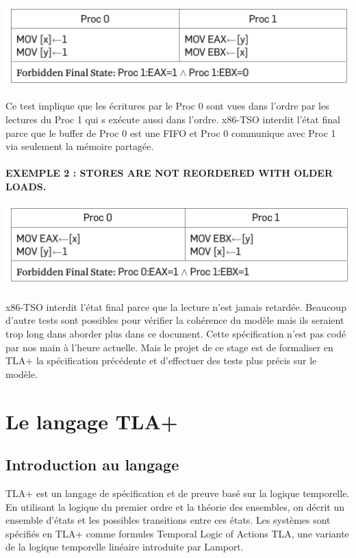 \documentclass[12pt,a4paper]{article}
\begin{document}
	\begin{center}
		\includegraphics[scale=0.9]{exemple1.png}
	\end{center}

Ce test implique que les écritures par le Proc 0 sont vues dans l'ordre par les lectures du Proc 1 qui s exécute aussi dans l'ordre. x86-TSO interdit l'état final parce que le buffer de Proc 0 est une FIFO et Proc 0 communique avec Proc 1 via seulement la mémoire partagée.

\paragraph{EXEMPLE 2 : STORES ARE NOT REORDERED WITH OLDER LOADS.}
  
	\begin{center}
		\includegraphics[scale=0.9]{exemple2.png}
    \end{center}

x86-TSO interdit l'état final parce que la lecture n'est jamais retardée.
Beaucoup d'autre tests sont possibles pour vérifier la cohérence du modèle mais ils seraient trop long dans aborder plus dans ce document. Cette spécification n'est pas codé par nos main à l'heure actuelle. Mais le projet de ce stage est de formaliser en TLA+ la spécification précédente et d'effectuer des tests plus précis sur le modèle.

\section{Le langage TLA+}

\subsection{Introduction au langage}

TLA+ est un langage de spécification et de preuve basé sur la logique temporelle. En utilisant la logique du premier ordre et la théorie des ensembles, on décrit un ensemble d'états et les possibles transitions entre ces états. Les systèmes sont spécifiés en TLA+ comme formules Temporal Logic
of Actions TLA, une variante de la logique temporelle linéaire introduite par Lamport.
\end{document}
